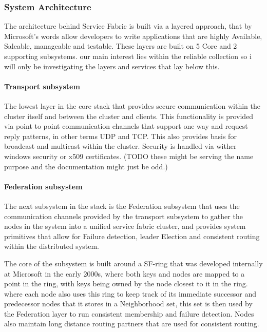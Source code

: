 \documentclass[a4paper,10pt,titlepage]{report}
\begin{document}
\subsubsection{System Architecture}

The architecture behind Service Fabric is built via a layered approach, that by Microsoft's words allow developers to write applications that are highly Available, Saleable, manageable and testable. These layers are built on 5 Core and 2 supporting subsystems.  our main interest lies within the reliable collection so i will only be investigating the layers and services that lay below this.



\paragraph{Transport subsystem}

The lowest layer in the core stack that provides secure communication within the cluster itself and between the cluster and clients. This functionality is provided via point to point communication channels that support one way and request reply patterns, in other terms UDP and TCP. This also provides basis for broadcast and multicast within the cluster. Security is handled via wither windows security or x509 certificates. (TODO these might be serving the name purpose and the documentation might just be odd.)

\paragraph{Federation subsystem}

The next subsystem in the stack is the Federation subsystem that uses the communication channels provided by the transport subsystem to gather the nodes in the system into a unified service fabric cluster, and provides system primitives that allow for Failure detection, leader Election and consistent routing within the distributed system.

The core of the subsystem is built around a SF-ring that was developed internally at Microsoft in the early 2000s, where both keys and nodes are mapped to a point in the ring, with keys being owned by the node closest to it in the ring. where each node also uses this ring to keep track of its immediate successor and predecessor nodes that it stores in a Neighborhood set, this set is then used by the Federation layer to run consistent membership and failure detection. Nodes also maintain long distance routing partners that are used for consistent routing.
\end{document}
